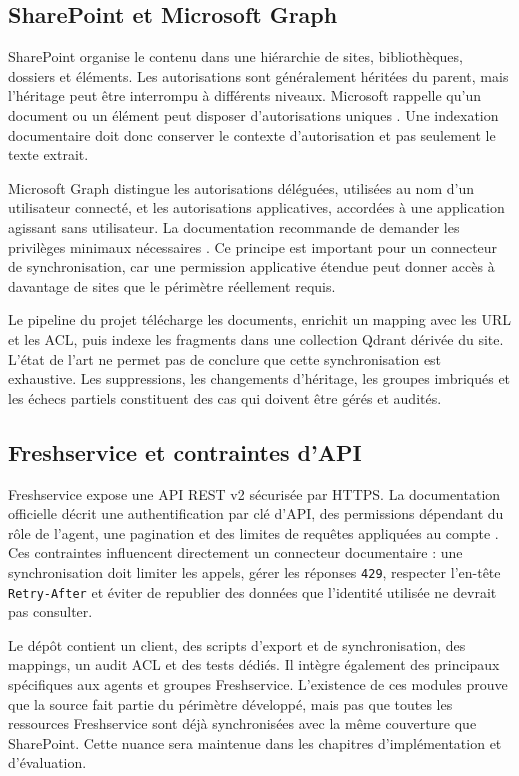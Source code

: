 \subsection{SharePoint et Microsoft Graph}

SharePoint organise le contenu dans une hiérarchie de sites, bibliothèques, dossiers et éléments. Les autorisations sont généralement héritées du parent, mais l'héritage peut être interrompu à différents niveaux. Microsoft rappelle qu'un document ou un élément peut disposer d'autorisations uniques \citep{MicrosoftSharePointPermissions2026}. Une indexation documentaire doit donc conserver le contexte d'autorisation et pas seulement le texte extrait.

Microsoft Graph distingue les autorisations déléguées, utilisées au nom d'un utilisateur connecté, et les autorisations applicatives, accordées à une application agissant sans utilisateur. La documentation recommande de demander les privilèges minimaux nécessaires \citep{MicrosoftGraphPermissions2026}. Ce principe est important pour un connecteur de synchronisation, car une permission applicative étendue peut donner accès à davantage de sites que le périmètre réellement requis.

Le pipeline du projet télécharge les documents, enrichit un mapping avec les URL et les ACL, puis indexe les fragments dans une collection Qdrant dérivée du site. L'état de l'art ne permet pas de conclure que cette synchronisation est exhaustive. Les suppressions, les changements d'héritage, les groupes imbriqués et les échecs partiels constituent des cas qui doivent être gérés et audités.

\subsection{Freshservice et contraintes d'API}

Freshservice expose une API REST v2 sécurisée par HTTPS. La documentation officielle décrit une authentification par clé d'API, des permissions dépendant du rôle de l'agent, une pagination et des limites de requêtes appliquées au compte \citep{FreshserviceAPI2026}. Ces contraintes influencent directement un connecteur documentaire : une synchronisation doit limiter les appels, gérer les réponses \texttt{429}, respecter l'en-tête \texttt{Retry-After} et éviter de republier des données que l'identité utilisée ne devrait pas consulter.

Le dépôt contient un client, des scripts d'export et de synchronisation, des mappings, un audit ACL et des tests dédiés. Il intègre également des principaux spécifiques aux agents et groupes Freshservice. L'existence de ces modules prouve que la source fait partie du périmètre développé, mais pas que toutes les ressources Freshservice sont déjà synchronisées avec la même couverture que SharePoint. Cette nuance sera maintenue dans les chapitres d'implémentation et d'évaluation.

